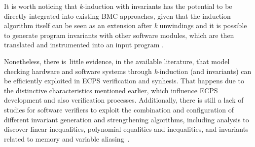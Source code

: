 \documentclass[format=acmsmall, review=false, screen=true]{acmart}
\begin{document}
It is worth noticing that \textit{k}-induction with invariants has the potential to be directly integrated into existing BMC approaches, given that the induction algorithm itself can be seen as an extension after \textit{k} unwindings and it is possible to generate program invariants with other software modules, which are then translated and instrumented into an input program \cite{Rocha15}.

Nonetheless, there is~little evidence, in the available literature, that model checking hardware and software systems through \textit{k}-induction (and invariants) can be efficiently exploited in ECPS verification and synhesis. That happens due to the distinctive characteristics mentioned earlier, which influence ECPS development and also verification processes. Additionally, there is still a lack of studies for software verifiers to exploit the combination and configuration of different invariant generation and strengthening algorithms, including analysis to discover linear inequalities, polynomial equalities and inequalities, and invariants related to memory and variable aliasing~\cite{Bradley07}.



\end{document}

